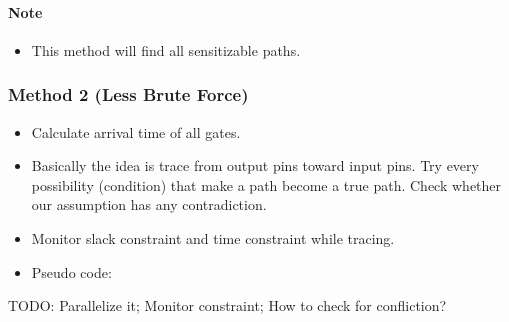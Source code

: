 \documentclass[]{article}
\providecommand{\tightlist}{%
  \setlength{\itemsep}{0pt}\setlength{\parskip}{0pt}}
\let\oldparagraph\paragraph
\renewcommand{\paragraph}[1]{\oldparagraph{#1}\mbox{}}
\begin{document}
\paragraph{Note}\label{note}

\begin{itemize}
\tightlist
\item
  This method will find all sensitizable paths.
\end{itemize}

\subsubsection{Method 2 (Less Brute
Force)}\label{method-2-less-brute-force}

\begin{itemize}
\item
  Calculate arrival time of all gates.
\item
  Basically the idea is trace from output pins toward input pins. Try
  every possibility (condition) that make a path become a true path.
  Check whether our assumption has any contradiction.
\item
  Monitor slack constraint and time constraint while tracing.
\item
  Pseudo code:
\end{itemize}

TODO: Parallelize it; Monitor constraint; How to check for confliction?
\end{document}

